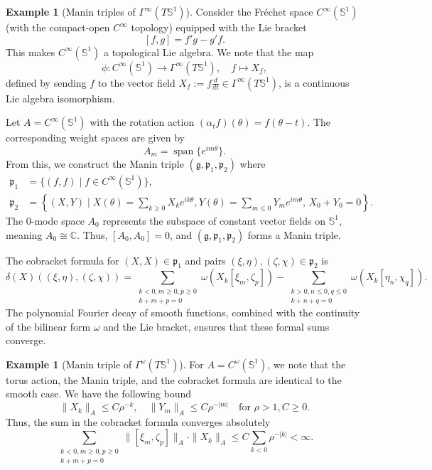 \documentclass[11pt,reqno]{amsart}
\theoremstyle{definition}
\newtheorem{example}[theorem]{Example}
\numberwithin{equation}{section}
\begin{document}
\begin{example}[Manin triples of $\Gamma^\infty(T\mathbb{S}^1)$]
Consider the Fréchet space $C^{\infty}(\mathbb{S}^1)$ (with the compact-open $C^{\infty}$ topology) equipped with the Lie bracket
\[
[f, g] = f'g - g'f.
\]
This makes $C^{\infty}(\mathbb{S}^1)$ a topological Lie algebra. We note that the map
\[
\phi : C^{\infty}(\mathbb{S}^1) \rightarrow \Gamma^{\infty}(T\mathbb{S}^1), \quad f \mapsto X_f,
\]
defined by sending $f$ to the vector field $X_f := f \frac{d}{dt} \in \Gamma^\infty(T\mathbb{S}^1)$, is a continuous Lie algebra isomorphism. 

Let $A = C^{\infty}(\mathbb{S}^1)$ with the rotation action $(\alpha_t f)(\theta) = f(\theta - t)$. The corresponding weight spaces are given by
\[
A_m = \operatorname{span}\{e^{im\theta}\}.
\]
From this, we construct the Manin triple $(\mathfrak{g}, \mathfrak{p}_1, \mathfrak{p}_2)$ where
\begin{align*}
\mathfrak{p}_1 &= \{(f, f) \mid f \in C^{\infty}(\mathbb{S}^1)\}, \\
\mathfrak{p}_2 &= \left\{(X, Y) \mid X(\theta) = \sum_{k \ge 0} X_k e^{ik\theta}, Y(\theta) = \sum_{m \le 0} Y_m e^{im\theta}, \, X_0 + Y_0 = 0\right\}.
\end{align*}
The $0$-mode space $A_0$ represents the subspace of constant vector fields on $\mathbb{S}^1$, meaning $A_0 \cong \mathbb{C}$. Thus, $[A_0, A_0] = 0$, and $(\mathfrak{g}, \mathfrak{p}_1, \mathfrak{p}_2)$ forms a Manin triple.

The cobracket formula for $(X, X) \in \mathfrak{p}_1$ and pairs $(\xi, \eta), (\zeta, \chi) \in \mathfrak{p}_2$ is
\[
\delta(X)((\xi, \eta), (\zeta, \chi)) = \sum_{\substack{k<0, m \ge 0, p \ge 0 \\ k+m+p=0}} \omega(X_k[\xi_m, \zeta_p]) - \sum_{\substack{k>0, n \le 0, q \le 0 \\ k+n+q=0}} \omega(X_k[\eta_n, \chi_q]).
\]
The polynomial Fourier decay of smooth functions, combined with the continuity of the bilinear form $\omega$ and the Lie bracket, ensures that these formal sums converge.
\end{example}

\begin{example}[Manin triple of $\Gamma^\omega(T\mathbb{S}^1)$]
For $A = C^{\omega}(\mathbb{S}^1)$, we note that the torus action, the Manin triple, and the cobracket formula are identical to the smooth case. We have the following bound
\[
\|X_k\|_A \le C\rho^{-k}, \quad \|Y_m\|_A \le C\rho^{-|m|} \quad \text{for } \rho > 1, C\geq0.
\]
Thus, the sum in the cobracket formula converges absolutely
\[
\sum_{\substack{k<0, m \ge 0, p \ge 0 \\ k+m+p=0}} \|[\xi_m, \zeta_p]\|_A \cdot \|X_k\|_A \le C \sum_{k<0} \rho^{-|k|} < \infty.
\]
\end{example}
\end{document}
